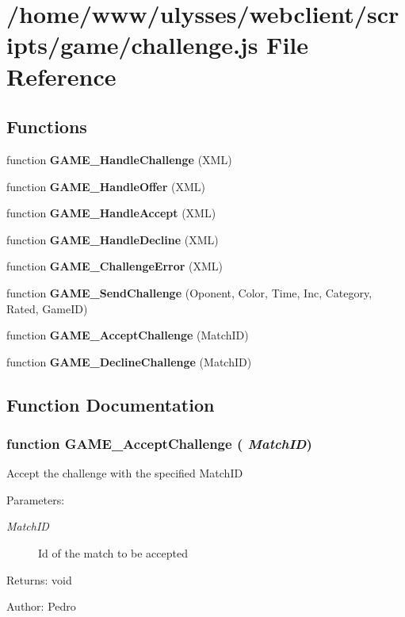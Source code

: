 \section{/home/www/ulysses/webclient/scripts/game/challenge.js File Reference}
\label{game_2challenge_8js}
\subsection*{Functions}
\begin{CompactItemize}
\item 
function {\bf GAME\_\-HandleChallenge} (XML)
\item 
function {\bf GAME\_\-HandleOffer} (XML)
\item 
function {\bf GAME\_\-HandleAccept} (XML)
\item 
function {\bf GAME\_\-HandleDecline} (XML)
\item 
function {\bf GAME\_\-ChallengeError} (XML)
\item 
function {\bf GAME\_\-SendChallenge} (Oponent, Color, Time, Inc, Category, Rated, GameID)
\item 
function {\bf GAME\_\-AcceptChallenge} (MatchID)
\item 
function {\bf GAME\_\-DeclineChallenge} (MatchID)
\end{CompactItemize}


\subsection{Function Documentation}
\subsubsection{\setlength{\rightskip}{0pt plus 5cm}function GAME\_\-AcceptChallenge ( {\em MatchID})}\label{game_2challenge_8js_b70be1fff0f97f347ffa5bf4110df841}


Accept the challenge with the specified MatchID

\begin{Desc}
\item[Parameters:]
\begin{description}
\item[{\em MatchID}]Id of the match to be accepted \end{description}
\end{Desc}
\begin{Desc}
\item[Returns:]void \end{Desc}
\begin{Desc}
\item[Author:]Pedro \end{Desc}



